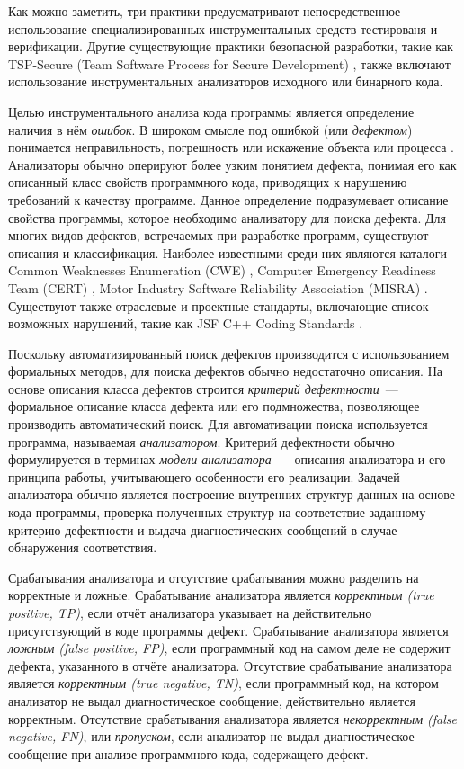 Как можно заметить, три практики предусматривают непосредственное использование специализированных инструментальных средств тестированя и верификации. Другие существующие практики безопасной разработки, такие как TSP-Secure (Team Software Process for Secure Development) \cite{tsp}, также включают использование инструментальных анализаторов исходного или бинарного кода.

Целью инструментального анализа кода программы является определение наличия в нём \textit{ошибок}. В широком смысле под ошибкой (или \textit{дефектом}) понимается неправильность, погрешность или искажение объекта или процесса \cite{lipaev-soft-eng}. Анализаторы обычно оперируют более узким понятием дефекта, понимая его как описанный класс свойств программного кода, приводящих к нарушению требований к качеству программе. Данное определение подразумевает описание свойства программы, которое необходимо анализатору для поиска дефекта. Для многих видов дефектов, встречаемых при разработке программ, существуют описания и классификация. Наиболее известными среди них являются каталоги Common Weaknesses Enumeration (CWE) \cite{cwe}, Computer Emergency Readiness Team (CERT) \cite{cert-org}, Motor Industry Software Reliability Association (MISRA) \cite{misra}. Существуют также отраслевые и проектные стандарты, включающие список возможных нарушений, такие как JSF C++ Coding Standards \cite{jsf}.

Поскольку автоматизированный поиск дефектов производится с использованием формальных методов, для поиска дефектов обычно недостаточно описания. На основе описания класса дефектов строится \textit{критерий дефектности}~--- формальное описание класса дефекта или его подмножества, позволяющее производить автоматический поиск. Для автоматизации поиска используется программа, называемая \textit{анализатором}. Критерий дефектности обычно формулируется в терминах \textit{модели анализатора}~--- описания анализатора и его принципа работы, учитывающего особенности его реализации. Задачей анализатора обычно является построение внутренних структур данных на основе кода программы, проверка полученных структур на соответствие заданному критерию дефектности и выдача диагностических сообщений в случае обнаружения соответствия.

Срабатывания анализатора и отсутствие срабатывания можно разделить на корректные и ложные. Срабатывание анализатора является \textit{корректным (true positive, TP)}, если отчёт анализатора указывает на действительно присутствующий в коде программы дефект. Срабатывание анализатора является \textit{ложным (false positive, FP)}, если программный код на самом деле не содержит дефекта, указанного в отчёте анализатора. Отсутствие срабатывание анализатора является \textit{корректным (true negative, TN)}, если программный код, на котором анализатор не выдал диагностическое сообщение, действительно является корректным. Отсутствие срабатывания анализатора является \textit{некорректным (false negative, FN)}, или \textit{пропуском}, если анализатор не выдал диагностическое сообщение при анализе программного кода, содержащего дефект.

